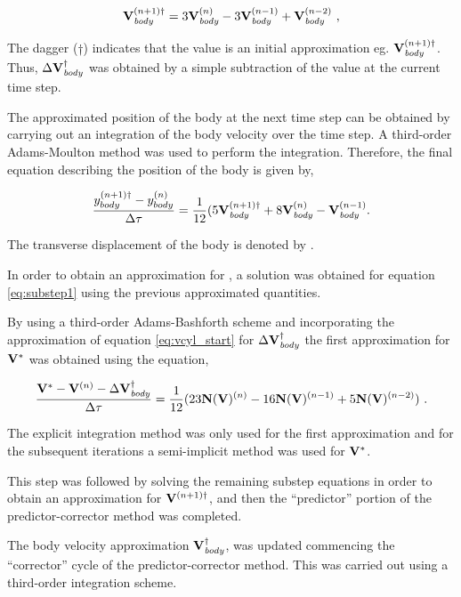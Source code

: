  
\begin{equation} \centering
\label{eq:vcyl_start}
\Vcyl^{(n+1)\dag} = 3\Vcyl^{(n)} - 3\Vcyl^{(n-1)} + \Vcyl^{(n-2)} ~,
\end{equation}


The dagger ($\dag$) indicates that the value is an initial approximation eg. $\mathbf{V}_{\mathit{body}}^{(n+1)\dag}$. Thus, $\Delta\mathbf{V}_{\mathit{body}}^{\dag}$ was obtained by a simple subtraction of the value at the current time step. 

The approximated position of the body at the next time step can be obtained by carrying out an integration of the body velocity over the time step. A third-order Adams-Moulton method was used to perform the integration. Therefore, the final equation describing the position of the body is given by, 

\begin{equation} \centering
	\label{eq:ycyl_start}
	\frac{\ycyl^{(n+1)\dag} - \ycyl^{(n)}}{\Delta\tau} = \frac{1}{12}(5\Vcyl^{(n+1)\dag} + 8\Vcyl^{(n)} - \Vcyl^{(n-1)}.
\end{equation}

The transverse displacement of the body is denoted by \ycyl.

In order to obtain an approximation for \Vint, a solution was obtained for equation \ref{eq:substep1} using the previous approximated quantities.

By using a third-order Adams-Bashforth scheme and incorporating the approximation of equation \ref{eq:vcyl_start} for  $\Delta\mathbf{V}_{\mathit{body}}^{\dag}$ the first approximation for $\mathbf{V}^{*}$ was obtained using the equation,
 
\begin{equation} \centering
\label{eq:vint_first}
\frac{\Vint - \Vn - \Delta\Vcyl^{\dag}}{\Delta\tau} = \frac{1}{12}(23\mathbf{N}(\vecV)^{(n)} - 16\mathbf{N}(\vecV)^{(n-1)} + 5\mathbf{N}(\vecV)^{(n-2)}) ~.
\end{equation}

The explicit integration method was only used for the first approximation and for the subsequent iterations a semi-implicit method was used for $\mathbf{V}^{*}$.

This step was followed by solving the remaining substep equations in order to obtain an approximation for  $\mathbf{V}^{(n+1)\dag}$, and then the ``predictor'' portion of the predictor-corrector method was completed.

The body velocity approximation $\mathbf{V}_{\mathit{body}}^{\dag}$, was updated commencing the ``corrector'' cycle of the predictor-corrector method. This was carried out using a third-order integration scheme. 

